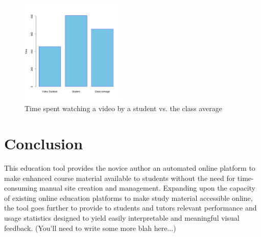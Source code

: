 \documentclass[a4paper, 11pt, conference]{ieeeconf}
\begin{document}
\begin{figure}
\centering
\includegraphics[width=0.45\textwidth]{videoduration.png}
\caption{\label{fig:videoduration}Time spent watching a video by a student vs. the class average}
\end{figure}

\section{Conclusion}
This education tool provides the novice author an automated online platform to make enhanced course material available to students without the need for time-consuming manual site creation and management. Expanding upon the capacity of existing online education platforms to make study material accessible online, the tool goes further to provide to students and tutors relevant performance and usage statistics designed to yield easily interpretable and meaningful visual feedback. (You'll need to write some more blah here...)

\end{document}
